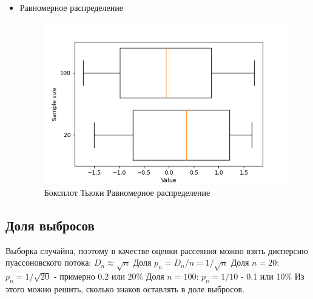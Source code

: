 \begin{itemize}
	\item{Равномерное распределение}
	\begin{figure}[H]
		\begin{center}
			\includegraphics[scale=0.75]{part_boxplot/figures/uniform}
			\caption{Боксплот Тьюки Равномерное распределение}
			\label{fig:boxplot_uniform}
		\end{center}
	\end{figure}

\end{itemize}

\subsection{Доля выбросов}
\label{subsec:result_outliers_fraction}
Выборка случайна, поэтому в качестве оценки рассеяния можно взять дисперсию пуассоновского потока: $D_n \approx \sqrt{n}$ \newline
Доля $p_n = D_n / n = 1 / \sqrt{n}$ \newline
Доля $n = 20$: $p_n = 1 / \sqrt{20}$ - примерно 0.2 или 20\% \newline
Доля $n = 100$: $p_n = 1 / 10$ - 0.1 или 10\% \newline
Из этого можно решить, сколько знаков оставлять в доле выбросов. \newline

